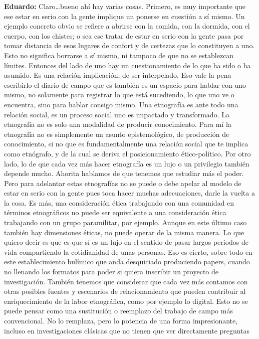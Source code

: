 \documentclass[
]{interact}
\begin{document}
\textbf{Eduardo:} Claro\ldots bueno ahí hay varias cosas. Primero, es
muy importante que ese estar en serio con la gente implique un ponerse
en cuestión a sí mismo. Un ejemplo concreto obvio se refiere a abrirse
con la comida, con la dormida, con el cuerpo, con los chistes; o sea ese
tratar de estar en serio con la gente pasa por tomar distancia de esos
lugares de confort y de certezas que lo constituyen a uno. Esto no
significa borrarse a sí mismo, ni tampoco de que no se establezcan
límites. Entonces del lado de uno hay un cuestionamiento de lo que ha
sido o ha asumido. Es una relación implicación, de ser interpelado. Eso
vale la pena escribirlo el diario de campo que es también es un espacio
para hablar con uno mismo, no solamente para registrar lo que está
sucediendo, lo que uno ve o encuentra, sino para hablar consigo mismo.
Una etnografía es ante todo una relación social, es un proceso social
uno es impactado y transformado. La etnografía no es solo una modalidad
de producir conocimiento. Para mí la etnografía no es simplemente un
asunto epistemológico, de producción de conocimiento, si no que es
fundamentalmente una relación social que te implica como etnógrafo, y de
la cual se deriva el posicionamiento ético-político. Por otro lado, lo
de que cada vez más hacer etnografía es un lujo o un privilegio también
depende mucho. Ahorita hablamos de que tenemos que estudiar más el
poder. Pero para adelantar estas etnografías no se puede o debe apelar
al modelo de estar en serio con la gente pues toca hacer muchas
adecuaciones, darle la vuelta a la cosa. Es más, una consideración ética
trabajando con una comunidad en términos etnográficos no puede ser
equivalente a una consideración ética trabajando con un grupo
paramilitar, por ejemplo. Aunque en este último caso también hay
dimensiones éticas, no puede operar de la misma manera. Lo que quiero
decir es que es que sí es un lujo en el sentido de pasar largos periodos
de vida compartiendo la cotidianidad de unas personas. Eso es cierto,
sobre todo en este establecimiento bulímico que anda desquiciado
produciendo papers, cuando no llenando los formatos para poder si quiera
inscribir un proyecto de investigación. También tenemos que considerar
que cada vez más contamos con otras posibles fuentes y escenarios de
relacionamiento que pueden contribuir al enriquecimiento de la labor
etnográfica, como por ejemplo lo digital. Esto no se puede pensar como
una sustitución o reemplazo del trabajo de campo más convencional. No lo
remplaza, pero lo potencia de una forma impresionante, incluso en
investigaciones clásicas que no tienen que ver directamente preguntas
\end{document}

